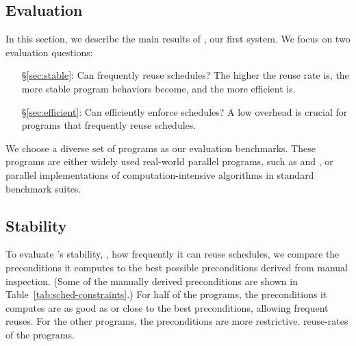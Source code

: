 \subsection{Evaluation} \label{sec:tern-eval}
In this section, we describe the main results of \tern, our first \smt
system.  We focus on two evaluation questions:

\begin{enumerate}

\item[\S\ref{sec:stable}:] Can \tern frequently reuse schedules?  The
  higher the reuse rate is, the more stable program behaviors become, and
  the more efficient \tern is.

\item[\S\ref{sec:efficient}:] Can \tern efficiently enforce schedules?  A
  low overhead is crucial for programs that frequently reuse schedules.




\end{enumerate}

We choose a diverse set of \nprog programs as our evaluation benchmarks.
These programs are either widely used real-world parallel programs, such
as \apache and \pbzip, or parallel
implementations of computation-intensive algorithms in standard benchmark
suites.

\subsection{Stability} \label{sec:tern-stable}

To evaluate \tern's stability, \ie, how frequently it can reuse schedules,
we compare the preconditions it computes to the best possible
preconditions derived from manual inspection. (Some of the manually
derived preconditions are shown in Table~\ref{tab:sched-constraints}.)
For half of the \nprog programs, the preconditions it computes are as
good as or close to the best preconditions, allowing frequent reuses.
For the other programs, the preconditions are more restrictive.
reuse-rates of the programs.

